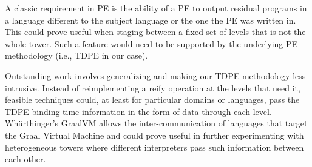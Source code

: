 \documentclass[a4paper,12pt,twoside,openright]{report}
\theoremstyle{definition}
\begin{document}
A classic requirement in PE is the ability of a PE to output residual programs in a language different to the subject language or the one the PE was written in. This could prove useful when staging between a fixed set of levels that is not the whole tower. Such a feature would need to be supported by the underlying PE methodology (i.e., TDPE in our case).

Outstanding work involves generalizing and making our TDPE methodology less intrusive. Instead of reimplementing a reify operation at the levels that need it, feasible techniques could, at least for particular domains or languages, pass the TDPE binding-time information in the form of data through each level. Wh{\"u}rthinger's GraalVM \cite{wurthinger2013one} allows the inter-communication of languages that target the Graal Virtual Machine and could prove useful in further experimenting with heterogeneous towers where different interpreters pass such information between each other.
\end{document}
